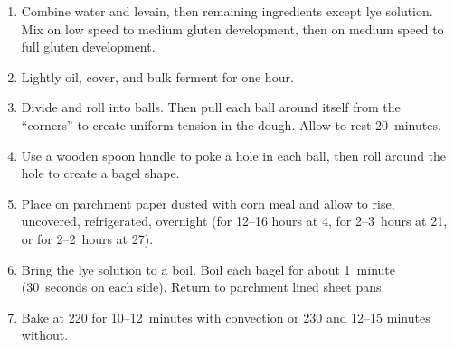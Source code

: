 
\begin{ingredients}
\end{ingredients}

\begin{recipe}
  \begin{enumerate}

  \item Combine water and levain, then remaining ingredients except
    lye solution.  Mix on low speed to medium gluten development, then
    on medium speed to full gluten development.

  \item Lightly oil, cover, and bulk ferment for one hour.

  \item Divide and roll into balls.  Then pull each ball around itself
    from the ``corners'' to create uniform tension in the dough.
    Allow to rest 20~minutes.

  \item Use a wooden spoon handle to poke a hole in each ball, then
    roll around the hole to create a bagel shape.

  \item Place on parchment paper dusted with corn meal and allow to
    rise, uncovered, refrigerated, overnight (for 12--16 hours at
    4\degreeC, for 2\fracH--3\fracH~hours at 21\degreeC, or for
    2--2\fracH~hours at 27\degreeC).

  \item Bring the lye solution to a boil.  Boil each bagel for about
    1~minute (30~seconds on each side).  Return to parchment lined
    sheet pans.

  \item Bake at 220\degreeC{} for 10--12~minutes with convection or
    230\degreeC{} and 12--15 minutes without.

  \end{enumerate}
\end{recipe}
